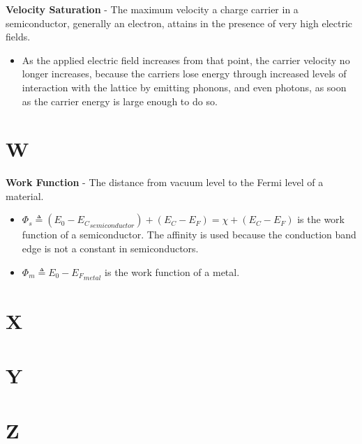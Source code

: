 \vspace{0.5cm}
\noindent
    \textbf{Velocity Saturation} - The maximum velocity a charge carrier in a semiconductor, generally an electron, attains in the presence of very high electric fields.
    \vspace{0.15cm}
    \begin{itemize}
        \setlength\itemsep{0.5em}
        \item{As the applied electric field increases from that point, the carrier velocity no longer increases, because the carriers lose energy through increased levels of interaction with the lattice by emitting phonons, and even photons, as soon as the carrier energy is large enough to do so.}
    \end{itemize}
\section{W}
    \textbf{Work Function} - The distance from vacuum level to the Fermi level of a material.
    \vspace{0.15cm}
    \begin{itemize}
        \setlength\itemsep{0.5em}
        \item{$\Phi_s \triangleq (E_0 - {E_C}_{semiconductor}) + (E_C - E_F) = \chi + (E_C - E_F)$ is the work function of a semiconductor.  The affinity is used because the conduction band edge is not a constant in semiconductors.}
        \item{$\Phi_m \triangleq E_0 - {E_F}_{metal}$ is the work function of a metal.}
    \end{itemize}
\section{X}
\section{Y}
\section{Z}
